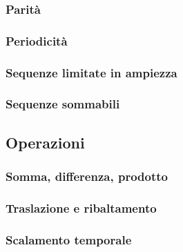 \documentclass[../main.tex]{subfiles}
\begin{document}
\subsubsection{Parità}
\subsubsection{Periodicità}
\subsubsection{Sequenze limitate in ampiezza}
\subsubsection{Sequenze sommabili}

\subsection{Operazioni}

\subsubsection{Somma, differenza, prodotto}
\subsubsection{Traslazione e ribaltamento}
\subsubsection{Scalamento temporale}
\end{document}
